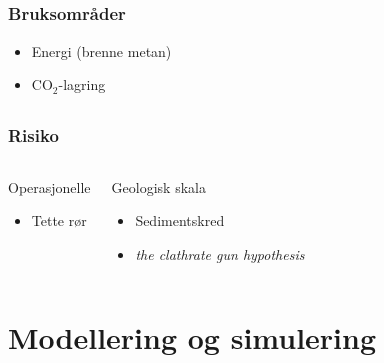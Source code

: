 \documentclass[utf8x, notes]{beamer}
\begin{document}
\subsection{}
\begin{frame}
\frametitle{Bruksområder}
\begin{itemize}
\item Energi (brenne metan)
\item CO$_2$-lagring
\end{itemize}
\end{frame}

\subsection{}
\begin{frame}
\frametitle{Risiko}
\begin{columns}
\begin{block}{Operasjonelle}
\begin{itemize}
\item Tette rør
\end{itemize}
\end{block}

\begin{block}{Geologisk skala}
\begin{itemize}
\item Sedimentskred
\item \emph{the clathrate gun hypothesis}
\end{itemize}
\end{block}

\end{columns}

\end{frame}


\section{Modellering og simulering}
\end{document}
